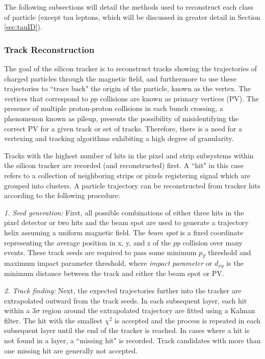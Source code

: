 The following subsections will detail the methods used to reconstruct each class of particle (except tau leptons, which will be discussed in greater detail in Section \ref{sec:tauID}).

\subsubsection{Track Reconstruction}\label{sec:TrackReco}

The goal of the silicon tracker is to reconstruct tracks showing the trajectories of charged particles through the magnetic field, and furthermore to use these trajectories to ``trace back" the origin of the particle, known as the vertex. The vertices that correspond to $pp$ collisions are known as primary vertices (PV). The presence of multiple proton-proton collisions in each bunch crossing, a phenomenon known as pileup, presents the possibility of misidentifying the correct PV for a given track or set of tracks. Therefore, there is a need for a vertexing and tracking algorithms exhibiting a high degree of granularity.

Tracks with the highest number of hits in the pixel and strip subsystems within the silicon tracker are recorded (and reconstructed) first. A ``hit" in this case refers to a collection of neighboring strips or pixels registering signal which are grouped into clusters. A particle trajectory can be reconstructed from tracker hits according to the following procedure\cite{TrackReco}:


\noindent\emph{1. Seed generation:} First, all possible combinations of either three hits in the pixel detector or two hits and the beam spot are used to generate a trajectory helix assuming a uniform magnetic field. The \textit{beam spot} is a fixed coordinate representing the average position in x, y, and z of the $pp$ collision over many events. These track seeds are required to pass some minimum $p_T$ threshold and maximum impact parameter threshold, where \textit{impact parameter} or $d_{xy}$ is the minimum distance between the track and either the beam spot or PV.


\noindent\emph{2. Track finding:} Next, the expected trajectories further into the tracker are extrapolated outward from the track seeds. In each subsequent layer, each hit within a $3\sigma$ region around the extrapolated trajectory are fitted using a Kalman filter\cite{Kalman}. The hit with the smallest $\chi^2$ is accepted and the process is repeated in each subsequent layer until the end of the tracker is reached. In cases where a hit is not found in a layer, a ``missing hit" is recorded. Track candidates with more than one missing hit are generally not accepted.



